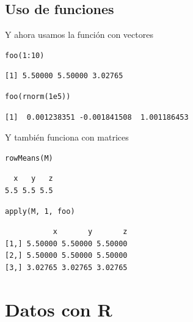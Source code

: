 \documentclass[xcolor={usenames,svgnames,dvipsnames}]{beamer}
\begin{document}
\subsection{Uso de funciones}
\label{sec-4-2}
\begin{frame}[fragile,label=sec-4-2-1]{Y ahora usamos la función con vectores}
 \lstset{language=R,label= ,caption= ,numbers=none}
\begin{lstlisting}
foo(1:10)
\end{lstlisting}

\begin{verbatim}
[1] 5.50000 5.50000 3.02765
\end{verbatim}

\lstset{language=R,label= ,caption= ,numbers=none}
\begin{lstlisting}
foo(rnorm(1e5))
\end{lstlisting}

\begin{verbatim}
[1]  0.001238351 -0.001841508  1.001186453
\end{verbatim}
\end{frame}

\begin{frame}[fragile,label=sec-4-2-2]{Y también funciona con matrices}
 \lstset{language=R,label= ,caption= ,numbers=none}
\begin{lstlisting}
rowMeans(M)
\end{lstlisting}

\begin{verbatim}
  x   y   z 
5.5 5.5 5.5
\end{verbatim}

\lstset{language=R,label= ,caption= ,numbers=none}
\begin{lstlisting}
apply(M, 1, foo)
\end{lstlisting}

\begin{verbatim}
           x       y       z
[1,] 5.50000 5.50000 5.50000
[2,] 5.50000 5.50000 5.50000
[3,] 3.02765 3.02765 3.02765
\end{verbatim}
\end{frame}


\section{Datos con R}
\label{sec-5}
\end{document}
